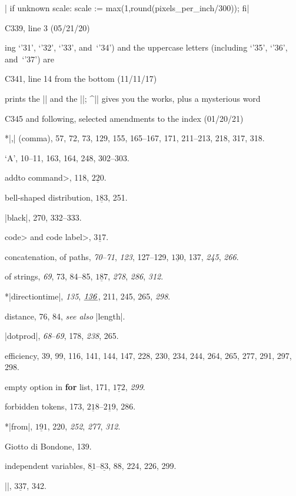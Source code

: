 \ninepoint\noindent
| if unknown scale: scale := max(1,round(pixels_per_inch/300)); fi|

\bugonpage C339, line 3 (05/21/20)

\ninepoint\noindent
ing `\char'31', `\char'32',
`\char'33', and~`\char'34') and the uppercase letters (including
`\char'35', `\char'36', and~`\char'37') are\cutpar

\bugonpage C341, line 14 from the bottom (11/11/17)

\ninepoint\noindent
prints the |\table| and the |\text|; ^|\bigtest| gives
you the works, plus a mysterious word\cutpar

\bugonpage C345 and following, selected amendments to the index (01/20/21)

\eightpoint
*|,| (comma), 57, 72, 73, 129, 155, 165--167, 171, 211--213, 218, 317, 318.\par
`A', 10--11, 163, 164, 248, 302--303.\par
\<addto command>, 118, $\underline{220}$.\par
bell-shaped distribution, $\underline{183}$, 251.\par
|black|, 270, 332--333.\par
\<code> and \<code label>, $\underline{317}$.\par
concatenation, of paths, {\it70}--{\it71}, {\it123}, 127--129, $\underline{130}$, 137, {\it245}, {\it266}.\par
\quad of strings, {\it69}, 73, 84--85, $\underline{187}$, {\it278}, {\it286}, {\it312}.\par
*|directiontime|, {\it135}, $\underline{\it136}$, 211, 245, 265, {\it298}.\par
distance, 76, 84, {\sl see also\/} |length|.\par
|dotprod|, {\it68}--{\it69}, 178, {\it238}, 265.\par
efficiency, 39, 99, 116, 141, 144, 147, 228, 230, 234, 244, 264, 265, 277,  291, 297, 298.\par
empty option in {\bf for\/} list, 171, $\underline{172}$, {\it299}.\par
forbidden tokens, 173, $\underline{218}$--$\underline{219}$, 286.\par
*|from|, $\underline{191}$, 220, {\it252}, {\it277}, {\it312}.\par
Giotto di Bondone, 139.\par
independent variables, $\underline{81}$--$\underline{83}$, 88, 224, 226, 299.\par
|\init|, $\underline{337}$, 342.\par
